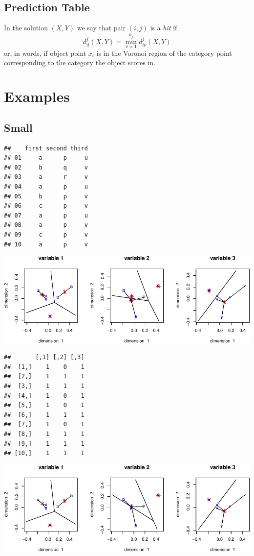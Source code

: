 \documentclass[
  12pt,
]{article}
\begin{document}
\subsection{Prediction Table}\label{prediction-table}

In the solution \((X,Y)\) we say that pair \((i,j)\) is a \emph{hit} if
\[
d_{il}^j(X,Y)=\min_{\nu=1}^{k_j}d_{i\nu}^j(X,Y)
\]
or, in words, if object point \(x_i\) is in the Voronoi region of the category point
corresponding to the category the object scores in.

\section{Examples}\label{examples}

\subsection{Small}\label{small}

\begin{verbatim}
##    first second third
## 01     a      p     u
## 02     b      q     v
## 03     a      r     v
## 04     a      p     u
## 05     b      p     v
## 06     c      p     v
## 07     a      p     u
## 08     a      p     v
## 09     c      p     v
## 10     a      p     v
\end{verbatim}

\includegraphics{smacofHC_files/figure-latex/smallhomals-1.pdf}

\begin{verbatim}
##       [,1] [,2] [,3]
##  [1,]    1    0    1
##  [2,]    1    1    1
##  [3,]    1    1    1
##  [4,]    1    0    1
##  [5,]    1    0    1
##  [6,]    1    1    1
##  [7,]    1    0    1
##  [8,]    1    1    1
##  [9,]    1    1    1
## [10,]    1    1    1
\end{verbatim}

\includegraphics{smacofHC_files/figure-latex/small00-1.pdf}
\end{document}
